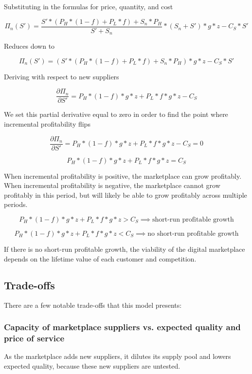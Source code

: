 Substituting in the formulas for price, quantity, and cost

\[ \Pi_n(S') = \dfrac{S'*(P_H*(1-f) + P_L*f) + S_n * P_H}{S' + S_n} * (S_n + S') * g * z - C_S * S' \]

\vspace{5 mm}
Reduces down to

\[ \Pi_n(S') = (S'*(P_H*(1-f) + P_L*f) + S_n * P_H ) * g * z - C_S * S' \]

\vspace{5 mm}
Deriving with respect to new suppliers

\[ \dfrac{\partial{\Pi_n}}{\partial{S'}} = P_H * (1-f) * g * z + P_L * f * g * z - C_S \]

\vspace{5 mm}
We set this partial derivative equal to zero in order to find the point where incremental profitability flips

\[ \dfrac{\partial{\Pi_n}}{\partial{S'}} = P_H * (1-f) * g * z + P_L * f * g * z - C_S = 0 \]

\[ P_H * (1-f) * g * z + P_L * f * g * z = C_S \]

\vspace{5 mm}
When incremental profitability is positive, the marketplace can grow profitably. When incremental profitability is negative, the marketplace cannot grow profitably in this period, but will likely be able to grow profitably across multiple periods.

\[ P_H * (1-f) * g * z + P_L * f * g * z > C_S \implies \textrm{short-run profitable growth} \]

\[ P_H * (1-f) * g * z + P_L * f * g * z < C_S \implies \textrm{no short-run profitable growth} \]

If there is no short-run profitable growth, the viability of the digital marketplace depends on the lifetime value of each customer and competition.

\subsection{Trade-offs}

There are a few notable trade-offs that this model presents:

\subsubsection{Capacity of marketplace suppliers vs. expected quality and price of service}

As the marketplace adds new suppliers, it dilutes its supply pool and lowers expected quality, because these new suppliers are untested.

